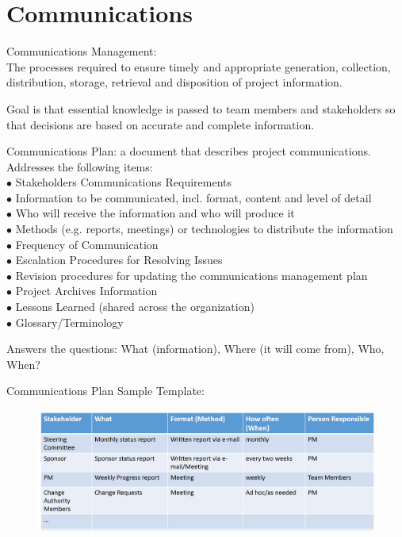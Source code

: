 \documentclass[]{project_plan}
\newcommand{\bulletPoint}{\hspace{-3.1pt}$\bullet$ \hspace{5pt}}
\begin{document}
\newpage

\section{Communications}

Communications Management:\\
The processes required to ensure timely and appropriate generation,
collection, distribution, storage, retrieval and disposition of project information.

Goal is that essential knowledge is passed to team members and stakeholders so that decisions are based on accurate and
complete information.

Communications Plan: a document that describes project communications. Addresses the following items:\\
\bulletPoint Stakeholders Communications Requirements\\
\bulletPoint Information to be communicated, incl. format, content and level of detail\\
\bulletPoint Who will receive the information and who will produce it\\
\bulletPoint Methods (e.g. reports, meetings) or technologies to distribute the information\\
\bulletPoint Frequency of Communication\\
\bulletPoint Escalation Procedures for Resolving Issues\\
\bulletPoint Revision procedures for updating the communications management plan\\
\bulletPoint Project Archives Information\\
\bulletPoint Lessons Learned (shared across the organization)\\
\bulletPoint Glossary/Terminology

Answers the questions: What (information), Where (it will come from), Who, When?

Communications Plan Sample Template:
\begin{figure}[h!]
  \centering
  \includegraphics[width=\linewidth]{communications_plan_sample.png}
\end{figure}
\end{document}
